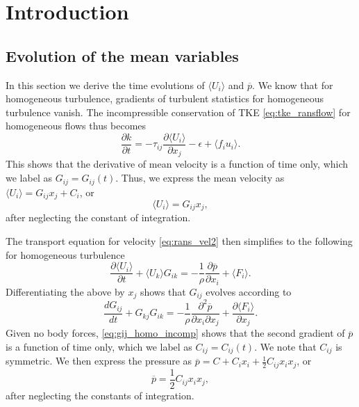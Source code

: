 \documentclass[oneside,a4paper,11pt]{report}
\newcommand{\pavg}{\overline{p}}
\newcommand{\rs}{\tau}          %
\newcommand{\uiavg}{\langle U_i \rangle}
\newcommand{\ukavg}{\langle U_k \rangle}
\newcommand{\uifluc}{u_i}
\begin{document}
%
\chapter{Introduction}
%

\section{Evolution of the mean variables}
\label{sec:homo_mean_incomp}
In this section we derive the time evolutions of $\uiavg$ and $\pavg$. We know that for homogeneous turbulence, gradients of turbulent statistics for homogeneous turbulence vanish. The incompressible conservation of TKE \cref{eq:tke_ransflow} for homogeneous flows thus becomes
\begin{equation}
\frac{\partial k}{\partial t} = -\rs_{ij} \frac{\partial \uiavg}{\partial x_j} - \epsilon + \langle f_i \uifluc \rangle.
\end{equation}
This shows that the derivative of mean velocity is a function of time only, which we label as $G_{ij} = G_{ij}(t)$. Thus, we express the mean velocity as $\uiavg = G_{ij} x_j + C_i$, or 
\begin{equation}
\label{eq:ui_homo_incomp}
\uiavg = G_{ij} x_j ,
\end{equation}
after neglecting the constant of integration.

The transport equation for velocity \cref{eq:rans_vel2} then simplifies to the following for homogeneous turbulence
\begin{equation}
\frac{\partial \uiavg}{\partial t} + \ukavg G_{ik} = -\frac{1}{\rho} \frac{\partial \pavg}{\partial x_i} + \langle F_i \rangle.
\end{equation}
Differentiating the above by $x_j$ shows that $G_{ij}$ evolves according to
\begin{equation}
\label{eq:gij_homo_incomp}
\frac{d G_{ij} }{d t} + G_{kj}G_{ik} = -\frac{1}{\rho} \frac{\partial ^2 \pavg}{\partial x_i \partial x_j} + \frac{\partial \langle F_i \rangle}{\partial x_j} .
\end{equation}
Given no body forces, \cref{eq:gij_homo_incomp} shows that the second gradient of $\pavg$ is a function of time only, which we label as $C_{ij} = C_{ij}(t)$. We note that $C_{ij}$ is symmetric. We then express the pressure as $\pavg = C + C_i x_i + \frac{1}{2} C_{ij} x_ix_j$, or
\begin{equation}
    \pavg = \frac{1}{2} C_{ij} x_i x_j,
\end{equation}
after neglecting the constants of integration. 
\end{document}
